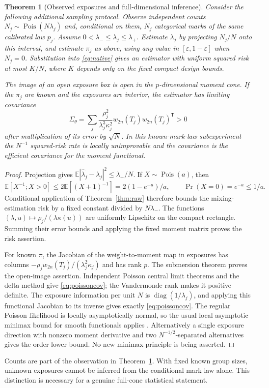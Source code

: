 \documentclass[11pt,reqno]{amsart}
\numberwithin{equation}{section}
\newtheorem{theorem}{Theorem}[section]
\theoremstyle{definition}\newtheorem{definition}[theorem]{Definition}
\theoremstyle{remark}\newtheorem{remark}[theorem]{Remark}
\newcommand{\diag}{\operatorname{diag}}
\newcommand{\eps}{\varepsilon}
\begin{document}
\begin{theorem}[Observed exposures and full-dimensional inference]\label{thm:poisson}
Consider the following additional sampling protocol. Observe independent counts $N_j\sim\operatorname{Pois}(N\lambda_j)$ and, conditional on them, $N_j$ categorical marks of the same calibrated law $p_j$. Assume $0<\lambda_-\le\lambda_j\le\lambda_+$. Estimate $\lambda_j$ by projecting $N_j/N$ onto this interval, and estimate $\pi_j$ as above, using any value in $[\eps,1-\eps]$ when $N_j=0$. Substitution into \eqref{eq:native} gives an estimator with uniform squared risk at most $K/N$, where $K$ depends only on the fixed compact design bounds.

The image of an open exposure box is open in the $p$-dimensional moment cone. If the $\pi_j$ are known and the exposures are interior, the estimator has limiting covariance
\begin{equation}\label{eq:poissoncov}
 \Sigma_\theta=\sum_j\frac{\rho_j^2}{\lambda_j^3\kappa_j^2}
           w_{2n}(T_j)w_{2n}(T_j)^{\mathsf T}>0
\end{equation}
after multiplication of its error by $\sqrt N$. In this known-mark-law subexperiment the $N^{-1}$ squared-risk rate is locally unimprovable and the covariance is the efficient covariance for the moment functional.
\end{theorem}
\begin{proof}
Projection gives $\mathbb E|\widehat\lambda_j-\lambda_j|^2\le\lambda_+/N$. If $X\sim\operatorname{Pois}(a)$, then
\[
 \mathbb E[X^{-1};X>0]\le2\mathbb E[(X+1)^{-1}]
       =2(1-e^{-a})/a,\qquad \Pr(X=0)=e^{-a}\le1/a.
\]
Conditional application of Theorem~\ref{thm:raw} therefore bounds the mixing-estimation risk by a fixed constant divided by $N\lambda_-$. The functions $(\lambda,u)\mapsto\rho_j/(\lambda\kappa(u))$ are uniformly Lipschitz on the compact rectangle. Summing their error bounds and applying the fixed moment matrix proves the risk assertion.

For known $\pi$, the Jacobian of the weight-to-moment map in exposures has columns $-\rho_jw_{2n}(T_j)/(\lambda_j^2\kappa_j)$ and has rank $p$. The submersion theorem proves the open-image assertion. Independent Poisson central limit theorems and the delta method give \eqref{eq:poissoncov}; the Vandermonde rank makes it positive definite. The exposure information per unit $N$ is $\diag(1/\lambda_j)$, and applying this functional Jacobian to its inverse gives exactly \eqref{eq:poissoncov}. The regular Poisson likelihood is locally asymptotically normal, so the usual local asymptotic minimax bound for smooth functionals applies \cite[Chapters 7--8]{vdV}. Alternatively a single exposure direction with nonzero moment derivative and two $N^{-1/2}$-separated alternatives gives the order lower bound. No new minimax principle is being asserted.
\end{proof}
Counts are part of the observation in Theorem~\ref{thm:poisson}. With fixed known group sizes, unknown exposures cannot be inferred from the conditional mark law alone. This distinction is necessary for a genuine full-cone statistical statement.
\end{document}
